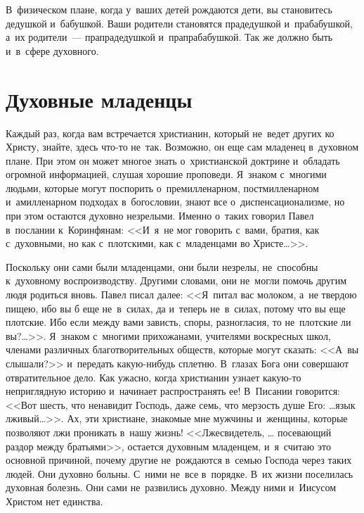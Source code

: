 \documentclass[12pt,article,a4paper,fittopage]{ncc}
\begin{document}
\begin{multicols}{2}
В~физическом плане, когда у~ваших детей рождаются дети, вы становитесь дедушкой и~бабушкой. Ваши родители становятся прадедушкой и~прабабушкой, а~их родители~--- прапрадедушкой и~прапрабабушкой. Так же должно быть и~в~сфере духовного.

\section*{Духовные младенцы}

Каждый раз, когда вам встречается христианин, который не~ведет других ко Христу, знайте, здесь что-то не~так. Возможно, он еще сам младенец в~духовном плане. При этом он может многое знать о~христианской доктрине и~обладать огромной информацией, слушая хорошие проповеди. Я~знаком с~многими людьми, которые могут поспорить о~премилленарном, постмилленарном и~амилленарном подходах в~богословии, знают все о~диспенсационализме, но при этом остаются духовно незрелыми. Именно о~таких говорил Павел в~послании к~Коринфянам: <<И~я~не мог говорить с~вами, братия, как с~духовными, но как с~плотскими, как с~младенцами во Христе\ldots >>.

Поскольку они сами были младенцами, они были незрелы, не~способны к~духовному воспроизводству. Другими словами, они не~могли помочь другим людя родиться вновь. Павел писал далее: <<Я~питал вас молоком, а~не твердою пищею, ибо вы б еще не~в~силах, да и~теперь не~в~силах, потому что вы еще плотские. Ибо если между вами зависть, споры, разногласия, то не~плотские ли вы?\ldots>>. Я~знаком с~многими прихожанами, учителями воскресных школ, членами различных благотворительных обществ, которые могут сказать: <<А~вы слышали?>> и~передать какую-нибудь сплетню. В~глазах Бога они совершают отвратительное дело. Как ужасно, когда христианин узнает какую-то неприглядную историю и~начинает распространять ее! В~Писании говорится: <<Вот шесть, что ненавидит Господь, даже семь, что мерзость душе Его: \ldots язык лживый\ldots{}>>. Ах, эти христиане, знакомые мне мужчины и~женщины, которые позволяют лжи проникать в~нашу жизнь! <<Лжесвидетель, \ldots{} посевающий раздор между братьями>>, остается духовным младенцем, и~я~считаю это основной причиной, почему другие не~рождаются в~семью Господа через таких людей. Они духовно больны. С~ними не~все в~порядке. В~их жизни поселилась духовная болезнь. Они сами не~развились духовно. Между ними и~Иисусом Христом нет единства.


\end{multicols}
\end{document}

